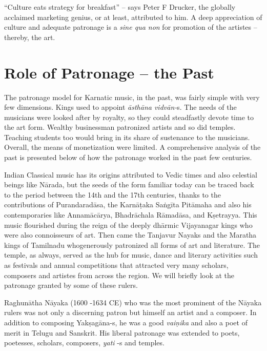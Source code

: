 “Culture eats strategy for breakfast” – says Peter F Drucker, the globally acclaimed marketing genius, or at least, attributed to him. A deep appreciation of culture and adequate patronage is a \textit{sine qua non} for promotion of the artistes – thereby, the art.

\vspace{-.4cm}

\section*{Role of Patronage – the Past}

\vspace{-.2cm}

The patronage model for Karnatic music, in the past, was fairly simple with very few dimensions. Kings used to appoint \textit{āsthāna vidvān-}s. The needs of the musicians were looked after by royalty, so they could steadfastly devote time to the art form. Wealthy businessman patronized artists and so did temples. Teaching students too would bring in its share of sustenance to the musicians. Overall, the means of monetization were limited. A comprehensive analysis of the past is presented below of how the patronage worked in the past few centuries.

Indian Classical music has its origins attributed to Vedic times and also celestial beings like Nārada, but the seeds of the form familiar today can be traced back to the period between the 14th and the 17th centuries, thanks to the contributions of Purandaradāsa, the Karnāṭaka Saṅgīta Pitāmaha and also his contemporaries like Annamācārya, Bhadrāchala Rāmadāsa, and Kṣetrayya. This music flourished during the reign of the deeply dhārmic Vijayanagar kings who were also connoisseurs of art. Then came the Tanjavur Nayaks and the Maratha kings of Tamilnadu whogenerously patronized all forms of art and literature. The temple, as always, served as the hub for music, dance and literary activities such as festivals and annual competitions that attracted very many scholars, composers and artistes from across the region. We will briefly look at the patronage granted by some of these rulers.

Raghunātha Nāyaka (1600 -1634 CE) who was the most prominent of the Nāyaka rulers was not only a discerning patron but himself an artist and a composer. In addition to composing Yakṣagāna-s, he was a good \textit{vaiṇika} and also a poet of merit in Telugu and Sanskrit. His liberal patronage was extended to poets, poetesses, scholars, composers, \textit{yati} -s and temples.

